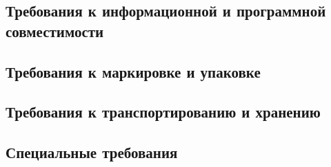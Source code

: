 \subsection{Требования к информационной и программной совместимости}
    \label{sec:req:compat}

\subsection{Требования к маркировке и упаковке}
    \label{sec:req:ship}

\subsection{Требования к транспортированию и хранению}
    \label{sec:req:data}

\subsection{Специальные требования}
    \label{sec:req:etc}

